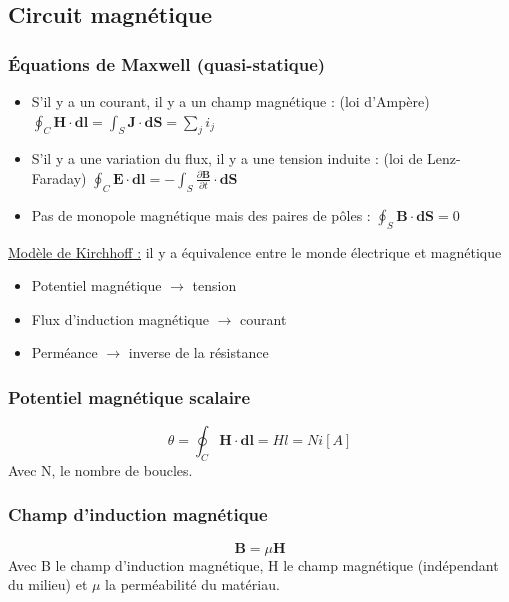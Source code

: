 \documentclass[../main.tex]{subfiles}
\begin{document}
\localtableofcontents

\subsection{Circuit magnétique}
\subsubsection{Équations de Maxwell (quasi-statique)}
\begin{itemize}
    \item S'il y a un courant, il y a un champ magnétique : (loi d'Ampère) $\oint_C \mathbf{H}\cdot \mathbf{dl} = \int_S \mathbf{J}\cdot \mathbf{dS} = \sum_j i_j$\\
    \item S'il y a une variation du flux, il y a une tension induite : (loi de Lenz-Faraday) $\oint_C \mathbf{E}\cdot \mathbf{dl} = -\int_S \frac{\partial \mathbf{B}}{\partial t}\cdot \mathbf{dS}$\\
    \item Pas de monopole magnétique mais des paires de pôles : $\oint_S \mathbf{B}\cdot \mathbf{dS}=0$\\
\end{itemize}

\quad \underline{Modèle de Kirchhoff :} il y a équivalence entre le monde électrique et magnétique \begin{itemize}
    \item Potentiel magnétique $\rightarrow$ tension\\
    \item Flux d'induction magnétique $\rightarrow$ courant\\
    \item Perméance $\rightarrow$ inverse de la résistance\\
\end{itemize}

\subsubsection{Potentiel magnétique scalaire}
\begin{equation}
    \theta = \oint_C \mathbf{H \cdot dl} = Hl = Ni [A]
\end{equation}
Avec N, le nombre de boucles.

\subsubsection{Champ d'induction magnétique}
\begin{equation}
    \mathbf{B} = \mu \mathbf{H}
\end{equation}
Avec B le champ d'induction magnétique, H le champ magnétique (indépendant du milieu) et $\mu$ la perméabilité du matériau.\\
\end{document}
